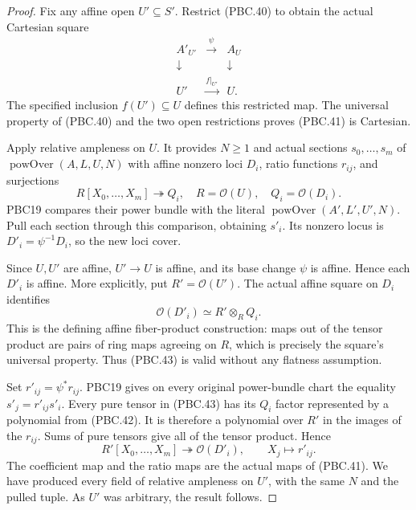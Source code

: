 \begin{proof}
Fix any affine open $U'\subseteq S'$.  Restrict (PBC.40)
to obtain the actual Cartesian square
\[
 \begin{array}{ccc}
 A'_{U'}&\xrightarrow{\psi}&A_U\\
 \downarrow&&\downarrow\\
 U'&\xrightarrow{f|_{U'}}&U .
 \end{array}
                                                        \tag{PBC.41}
\]
The specified inclusion $f(U')\subseteq U$ defines this
restricted map.  The universal property of (PBC.40) and
the two open restrictions proves (PBC.41) is Cartesian.

Apply relative ampleness on $U$.  It provides $N\ge1$
and actual sections $s_0,\ldots,s_m$ of
$\operatorname{powOver}(A,L,U,N)$ with affine nonzero
loci $D_i$, ratio functions $r_{ij}$, and surjections
\[
 R[X_0,\ldots,X_m]\twoheadrightarrow Q_i,
 \quad R=\mathcal O(U),\quad Q_i=\mathcal O(D_i).
                                                        \tag{PBC.42}
\]
PBC19 compares their power bundle with the literal
$\operatorname{powOver}(A',L',U',N)$.
Pull each section through this comparison, obtaining $s'_i$.
Its nonzero locus is
$D'_i=\psi^{-1}D_i$, so the new loci cover.

Since $U,U'$ are affine, $U'\to U$ is affine, and its
base change $\psi$ is affine.  Hence each $D'_i$ is
affine.  More explicitly, put $R'=\mathcal O(U')$.
The actual affine square on $D_i$ identifies
\[
 \mathcal O(D'_i)\simeq R'\otimes_R Q_i.
                                                        \tag{PBC.43}
\]
This is the defining affine fiber-product construction:
maps out of the tensor product are pairs of ring maps
agreeing on $R$, which is precisely the square's universal
property.  Thus (PBC.43) is valid without any flatness
assumption.

Set $r'_{ij}=\psi^*r_{ij}$.  PBC19 gives on every original
power-bundle chart the equality $s'_j=r'_{ij}s'_i$.
Every pure tensor in (PBC.43) has its $Q_i$ factor represented
by a polynomial from (PBC.42).  It is therefore a polynomial
over $R'$ in the images of the $r_{ij}$.  Sums of pure
tensors give all of the tensor product.  Hence
\[
 R'[X_0,\ldots,X_m]\twoheadrightarrow\mathcal O(D'_i),
       \qquad X_j\longmapsto r'_{ij}.
                                                        \tag{PBC.44}
\]
The coefficient map and the ratio maps are the actual maps
of (PBC.41).  We have produced every field of relative
ampleness on $U'$, with the same $N$ and the pulled tuple.
As $U'$ was arbitrary, the result follows.
\end{proof}

